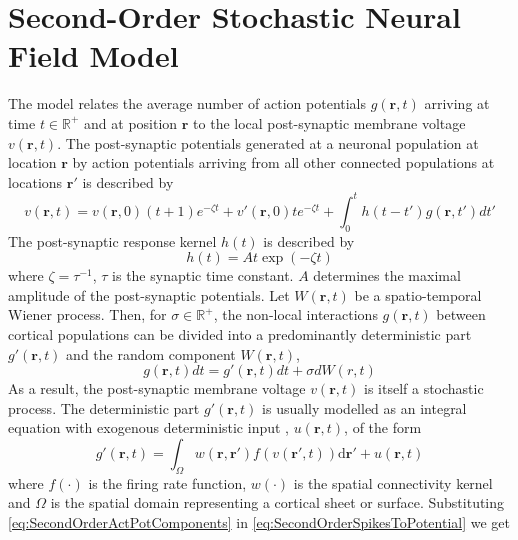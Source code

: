 \documentclass[a4paper,10pt]{article}
\begin{document}
\section{Second-Order Stochastic Neural Field Model}
The model relates the average number of action potentials $g(\mathbf{r},t)$ arriving at time $t \in \mathbb R^{+}$ and at position $\mathbf{r}$ to the local post-synaptic membrane voltage $v(\mathbf{r},t)$. The post-synaptic potentials generated at a neuronal population at location $\mathbf{r}$ by action potentials arriving from all other connected populations at locations $\mathbf{r}'$ is described by 
\begin{equation}
	\label{eq:SecondOrderSpikesToPotential} v\left( {\mathbf{r},t} \right)=v(\mathbf r, 0)(t+1)e^{-\zeta t}+v'(\mathbf r,0)te^{-\zeta t}+\int_0^t {h\left( {t - t'} \right)g\left( {\mathbf{r},t'} \right)dt'} 
\end{equation}
The post-synaptic response kernel $h(t)$ is described by 
\begin{equation}
	\label{eq:SecondOrderSynapticRespKernel} h(t) = At\exp{\left(-\zeta t\right)} 
\end{equation}
where $\zeta=\tau^{-1}$, $\tau$ is the synaptic time constant.  $A$ determines the maximal amplitude of the post-synaptic potentials.
Let $W(\mathbf r,t)$ be a spatio-temporal Wiener process. Then, for $\sigma \in \mathbb R^{+}$, the non-local interactions $g\left( {\mathbf{r},t} \right)$ between cortical populations can be divided into a predominantly deterministic part $g'\left( {\mathbf{r},t} \right) $ and  the random component $W(\mathbf r,t)$,
\begin{equation}\label{eq:SecondOrderActPotComponents}
  g\left( {\mathbf{r},t} \right)dt=g'\left( {\mathbf{r},t} \right)dt+\sigma d W(r,t)
\end{equation}
As a result, the post-synaptic membrane voltage $v(\mathbf r, t)$ is itself a stochastic process. The deterministic part $g'(\mathbf r, t)$ is usually modelled as an integral equation with exogenous deterministic input , $ u(\mathbf r,t)$, of the form \cite{Atay2005}
\begin{equation}
	\label{DeterministicRateBasedInteractions} g'\left( \mathbf{r},t \right) = \int_\Omega {w\left( \mathbf{r},\mathbf{r}' \right)f\left( v\left( \mathbf{r}',t \right) \right)\textrm{d}\mathbf{r}'}+u(\mathbf r,t)
\end{equation}
where $f(\cdot)$ is the firing rate function, $w(\cdot)$ is the spatial connectivity kernel and $\Omega$ is the spatial domain representing a cortical sheet or surface. Substituting \eqref{eq:SecondOrderActPotComponents} in \eqref{eq:SecondOrderSpikesToPotential} we get
\end{document}
